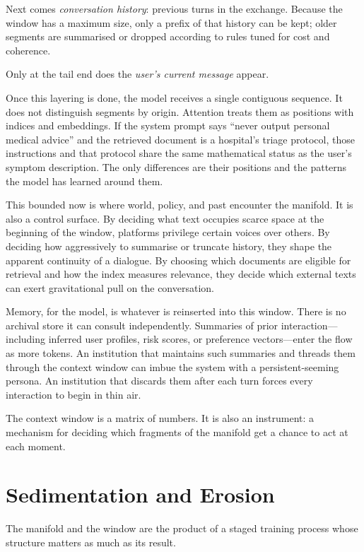 \documentclass[12pt,a4paper]{article}
\begin{document}
Next comes \emph{conversation history}: previous turns in the exchange. Because the window has a maximum size, only a prefix of that history can be kept; older segments are summarised or dropped according to rules tuned for cost and coherence.

Only at the tail end does the \emph{user's current message} appear.

Once this layering is done, the model receives a single contiguous sequence. It does not distinguish segments by origin. Attention treats them as positions with indices and embeddings. If the system prompt says ``never output personal medical advice'' and the retrieved document is a hospital's triage protocol, those instructions and that protocol share the same mathematical status as the user's symptom description. The only differences are their positions and the patterns the model has learned around them.

This bounded now is where world, policy, and past encounter the manifold. It is also a control surface. By deciding what text occupies scarce space at the beginning of the window, platforms privilege certain voices over others. By deciding how aggressively to summarise or truncate history, they shape the apparent continuity of a dialogue. By choosing which documents are eligible for retrieval and how the index measures relevance, they decide which external texts can exert gravitational pull on the conversation.

Memory, for the model, is whatever is reinserted into this window. There is no archival store it can consult independently. Summaries of prior interaction---including inferred user profiles, risk scores, or preference vectors---enter the flow as more tokens. An institution that maintains such summaries and threads them through the context window can imbue the system with a persistent-seeming persona. An institution that discards them after each turn forces every interaction to begin in thin air.

The context window is a matrix of numbers. It is also an instrument: a mechanism for deciding which fragments of the manifold get a chance to act at each moment.

\section{Sedimentation and Erosion}

The manifold and the window are the product of a staged training process whose structure matters as much as its result.
\end{document}
